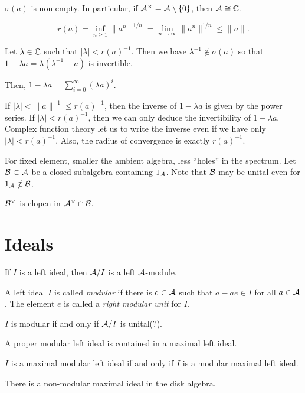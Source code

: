 \documentclass{../note}
\begin{document}
\begin{prb}
$\sigma(a)$ is non-empty.
In particular, if $\mathcal{A}^\times=\mathcal{A}\setminus\{0\}$, then $\mathcal{A}\cong\mathbb{C}$.
\end{prb}

\begin{prb}[Beurling]
\[r(a)=\inf_{n\ge1}\|a^n\|^{1/n}=\lim_{n\to\infty}\|a^n\|^{1/n}\le\|a\|.\]
\end{prb}
\begin{pf}
Let $\lambda\in\mathbb{C}$ such that $|\lambda|<r(a)^{-1}$.
Then we have $\lambda^{-1}\notin\sigma(a)$ so that $1-\lambda a=\lambda(\lambda^{-1}-a)$ is invertible.


Then, $1-\lambda a=\sum_{i=0}^\infty(\lambda a)^i$.


If $|\lambda|<\|a\|^{-1}\le r(a)^{-1}$, then the inverse of $1-\lambda a$ is given by the power series.
If $|\lambda|<r(a)^{-1}$, then we can only deduce the invertibility of $1-\lambda a$.
Complex function theory let us to write the inverse even if we have only $|\lambda|<r(a)^{-1}$.
Also, the radius of convergence is exactly $r(a)^{-1}$.
\end{pf}

\begin{prb}
For fixed element, smaller the ambient algebra, less ``holes'' in the spectrum.
Let $\mathcal{B}\subset\mathcal{A}$ be a closed subalgebra containing $1_{\mathcal{A}}$.
Note that $\mathcal{B}$ may be unital even for $1_{\mathcal{A}}\notin\mathcal{B}$.
\begin{parts}
\item $\mathcal{B}^\times$ is clopen in $\mathcal{A}^\times\cap\mathcal{B}$.
\end{parts}
\end{prb}





\section{Ideals}
\begin{prb}[Ideals]
\begin{parts}
\item If $I$ is a left ideal, then $\mathcal{A}/I$ is a left $\mathcal{A}$-module.
\end{parts}
\end{prb}

\begin{prb}
A left ideal $I$ is called \emph{modular} if there is $e\in\mathcal{A}$ such that $a-ae\in I$ for all $a\in\mathcal{A}$.
The element $e$ is called a \emph{right modular unit} for $I$.
\begin{parts}
\item $I$ is modular if and only if $\mathcal{A}/I$ is unital(?).
\item A proper modular left ideal is contained in a maximal left ideal.
\item $I$ is a maximal modular left ideal if and only if $I$ is a modular maximal left ideal.
\item There is a non-modular maximal ideal in the disk algebra.
\end{parts}
\end{prb}
\end{document}
